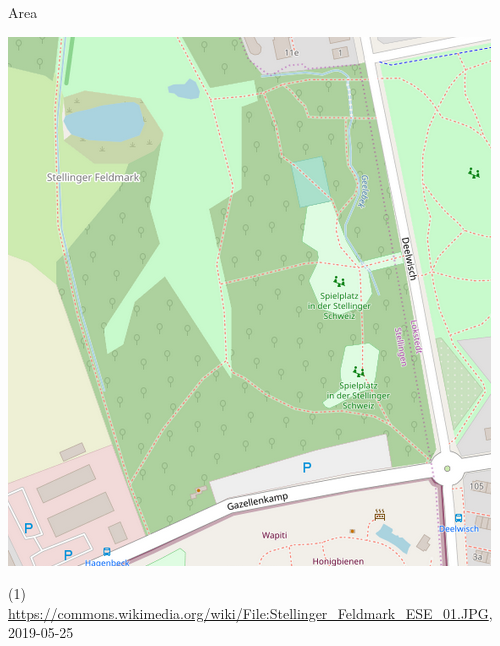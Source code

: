 \documentclass{beamer}
\begin{document}
\begin{frame}{Area}
\begin{center}
\begin{minipage}[b][0.6\textheight][c]{0.3\linewidth}
				\begin{center}
					\includegraphics[width=\linewidth,height=\textheight,keepaspectratio]{images/forest.png}
				\end{center}
			\end{minipage}
		\end{center}
		{\tiny (1) \url{https://commons.wikimedia.org/wiki/File:Stellinger_Feldmark_ESE_01.JPG}, 2019-05-25}
	\end{frame}
				
\end{document}
